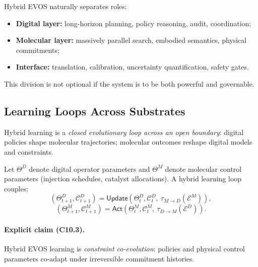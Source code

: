 \documentclass[11pt]{article}
\begin{document}
Hybrid EVOS naturally separates roles:
\begin{itemize}
  \item \textbf{Digital layer:} long-horizon planning, policy reasoning, audit, coordination;
  \item \textbf{Molecular layer:} massively parallel search, embodied semantics, physical commitments;
  \item \textbf{Interface:} translation, calibration, uncertainty quantification, safety gates.
\end{itemize}

This division is not optional if the system is to be both powerful and governable.

\subsection{Learning Loops Across Substrates}
\label{sec:learning-loops}

Hybrid learning is a \emph{closed evolutionary loop across an open boundary}:
digital policies shape molecular trajectories; molecular outcomes reshape digital models
and constraints.

Let $\Theta^D$ denote digital operator parameters and $\Theta^M$ denote molecular control
parameters (injection schedules, catalyst allocations). A hybrid learning loop couples:
\[
(\Theta^D_{t+1}, \mathcal{C}^D_{t+1})
=
\mathsf{Update}(\Theta^D_t,\mathcal{C}^D_t,\ \tau_{M\rightarrow D}(\mathcal{E}^M)),
\]
\[
(\Theta^M_{t+1}, \mathcal{C}^M_{t+1})
=
\mathsf{Act}(\Theta^M_t,\mathcal{C}^M_t,\ \tau_{D\rightarrow M}(\mathcal{E}^D)).
\]

\paragraph{Explicit claim (C10.3).}
Hybrid EVOS learning is \emph{constraint co-evolution}: policies and physical control
parameters co-adapt under irreversible commitment histories.
\end{document}
